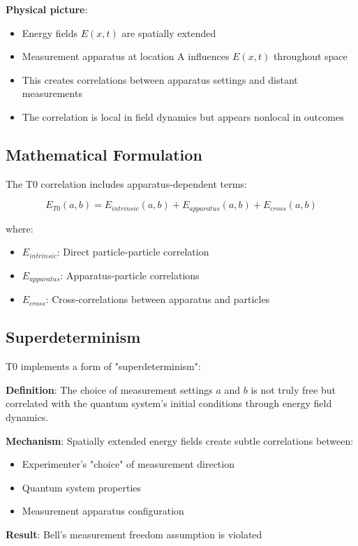 \documentclass[12pt,a4paper]{article}
\newcommand{\Efield}{E}
\begin{document}
	\textbf{Physical picture}:
	\begin{itemize}
		\item Energy fields $\Efield(x,t)$ are spatially extended
		\item Measurement apparatus at location A influences $\Efield(x,t)$ throughout space
		\item This creates correlations between apparatus settings and distant measurements
		\item The correlation is local in field dynamics but appears nonlocal in outcomes
	\end{itemize}
	
	\subsection{Mathematical Formulation}
	
	The T0 correlation includes apparatus-dependent terms:
	
	\begin{equation}
		E_{T0}(a,b) = E_{intrinsic}(a,b) + E_{apparatus}(a,b) + E_{cross}(a,b)
	\end{equation}
	
	where:
	\begin{itemize}
		\item $E_{intrinsic}$: Direct particle-particle correlation
		\item $E_{apparatus}$: Apparatus-particle correlations
		\item $E_{cross}$: Cross-correlations between apparatus and particles
	\end{itemize}
	
	\subsection{Superdeterminism}
	
	T0 implements a form of "superdeterminism":
	
	\begin{tcolorbox}[colback=blue!5!white,colframe=blue!75!black,title=T0 Superdeterminism]
		\textbf{Definition}: The choice of measurement settings $a$ and $b$ is not truly free but correlated with the quantum system's initial conditions through energy field dynamics.
		
		\textbf{Mechanism}: Spatially extended energy fields create subtle correlations between:
		\begin{itemize}
			\item Experimenter's "choice" of measurement direction
			\item Quantum system properties
			\item Measurement apparatus configuration
		\end{itemize}
		
		\textbf{Result}: Bell's measurement freedom assumption is violated
	\end{tcolorbox}
	
\end{document}

